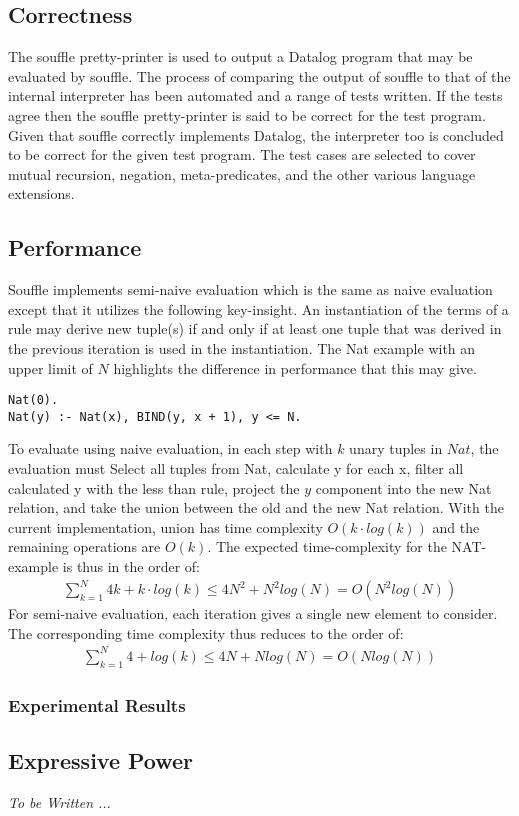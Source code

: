 \subsection{Correctness}
The souffle pretty-printer is used to output a Datalog program that may be evaluated by souffle. The process of comparing the output of souffle to that of the internal interpreter has been automated and a range of tests written. If the tests agree then the souffle pretty-printer is said to be correct for the test program. Given that souffle correctly implements Datalog, the interpreter too is concluded to be correct for the given test program. The test cases are selected to cover mutual recursion, negation, meta-predicates, and the other various language extensions.

\subsection{Performance}
Souffle implements semi-naive evaluation\cite{Green:2013:DRQ:2688167.2688168} which is the same as naive evaluation except that it utilizes the following key-insight. An instantiation of the terms of a rule may derive new tuple(s) if and only if at least one tuple that was derived in the previous iteration is used in the instantiation.
The Nat example with an upper limit of $N$ highlights the difference in performance that this may give.
\begin{verbatim}
Nat(0).
Nat(y) :- Nat(x), BIND(y, x + 1), y <= N.
\end{verbatim}
\noindent
To evaluate using naive evaluation, in each step with $k$ unary tuples in $Nat$, the evaluation must Select all tuples from Nat, calculate y for each x, filter all calculated y with the less than rule, project the $y$ component into the new Nat relation, and take the union between the old and the new Nat relation. With the current implementation, union has time complexity $O(k \cdot log(k))$ and the remaining operations are $O(k)$. The expected time-complexity for the NAT-example is thus in the order of:
\begin{align*}
\sum_{k = 1}^{N} 4 k + k \cdot log (k) \leq 4 N^2 + N^2 log(N) = O(N^2 log(N))
\end{align*}
For semi-naive evaluation, each iteration gives a single new element to consider. The corresponding time complexity thus reduces to the order of:
\begin{align*}
	\sum_{k = 1}^{N} 4 + log (k) \leq 4N + N log(N) = O(N log(N))
\end{align*}

\subsubsection{Experimental Results}



\subsection{Expressive Power}
\textit{To be Written ... }